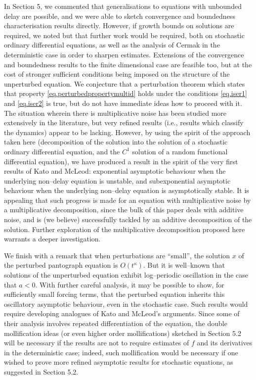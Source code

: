 \documentclass[a4paper,10pt,reqno]{amsart}
\numberwithin{equation}{section}
\theoremstyle{definition}
\theoremstyle{remark}
\DeclareMathOperator{\1}{\mathbbm 1}
\begin{document}
In Section 5, we commented that generalisations to equations with unbounded delay are possible, and we were able to sketch convergence and boundedness characterisation results directly. However, if growth bounds on solutions are required, we noted but that further work would be required, both on stochastic ordinary differential equations, as well as the analysis of Cermak in the deterministic case in order to sharpen estimates. Extensions of the convergence and boundedness results to the finite dimensional case are feasible too, but at the cost of stronger sufficient conditions being imposed on the structure of the unperturbed equation. We conjecture that a perturbation theorem which states that property \eqref{eq.perturbedpropertymultid} holds under the conditions \eqref{eq.iser1} and \eqref{eq.iser2} is true, but do not have immediate ideas how to proceed with it. The situation wherein there is multiplicative noise has been studied more extensively in the literature, but very refined results (i.e., results which classify the dynamics) appear to be lacking. However, by using the spirit of the approach taken here (decomposition of the solution into the solution of a stochastic ordinary differential equation, and the $C^1$ solution of a random functional differential equation), we have produced a result in the spirit of the very first results of Kato and McLeod: exponential asymptotic behaviour when the underlying non--delay equation is unstable, and subexponential asymptotic behaviour when the underlying non--delay equation is asymptotically stable. It is appealing that such progress is made for an equation with multiplicative noise by a multiplicative decomposition, since the bulk of this paper deals with additive noise, and is (we believe) successfully tackled by an additive decomposition of the solution. Further exploration of the multiplicative decomposition proposed here warrants a deeper investigation.     

We finish with a remark that when perturbations are ``small'', the solution $x$ of the perturbed pantograph equation is $O(t^\kappa)$. But it is well--known that solutions of the unperturbed equation exhibit log--periodic oscillation in the case that $a<0$. With further careful analysis, it may be possible to show, for sufficiently small forcing terms, that the perturbed equation inherits this oscillatory asymptotic behaviour, even in the stochastic case. Such results would require developing analogues of Kato and McLeod's arguments. Since some of their analysis involves repeated differentiation of the equation, the double mollification ideas (or even higher order mollifications) sketched in Section 5.2 will be necessary if the results are not to require estimates of $f$ and its derivatives in the deterministic case; indeed, such mollification would be necessary if one wished to prove more refined asymptotic results for stochastic equations, as suggested in Section 5.2.   
\end{document}
